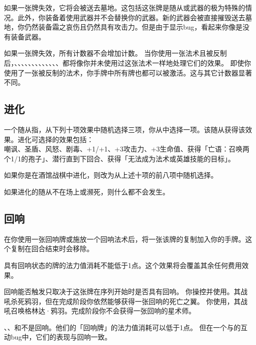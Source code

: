 如果一张牌失效，它将会被送去墓地。这包括这张牌是随从或武器的极为特殊的情况。此外，你装备着使用武器并不会替换你的武器。新的武器会被直接摧毁送去墓地，你仍然装备霜之哀伤且仍然具有攻击力。但是由于显示bug，看起来你像是没有装备武器。

如果一张牌失效，所有计数器不会增加计数。
\example 当你使用一张法术且被反制后，、、、、、、、、、、、、、都将像你并未使用过这张法术一样地处理它们的效果。
\exception 即使你使用了一张被反制的法术，你手牌中所有牌也都可以被激活。这与其它计数器显著不同。

\subsection{进化}
\label{adapt}

一个随从指，从下列十项效果中随机选择三项，你从中选择一项。该随从获得该效果。进化可选择的效果包括：\\
嘲讽、圣盾、风怒、剧毒、+1/+1、+3攻击力、+3生命值、获得「亡语：召唤两个1/1的孢子」、潜行直到下回合、获得「无法成为法术或英雄技能的目标」。

如果你是在酒馆战棋中进化，则改为从上述十项的前八项中随机选择。

如果进化的随从不在场上或濒死，则什么都不会发生。

\subsection{回响}
\label{echo}

在你使用一张回响牌或施放一个回响法术后，将一张该牌的复制加入你的手牌。这个复制在回合结束时会移除。

具有回响状态的牌的法力值消耗不能低于1点。这个效果将会覆盖其余任何费用效果。

回响能否触发只取决于这张牌在序列开始时是否具有回响。
\example 你操控并使用。其战吼杀死鸦羽，但在完成阶段你依然能够获得一张回响的死亡之翼。
\example 你使用，其战吼召唤格林达·鸦羽。完成阶段你不会获得一张回响的星术师。

、、和不是回响。他们的「回响牌」的法力值消耗可以低于1点。
\notice 但在一个与的互动bug中，它们的表现与回响一致。


